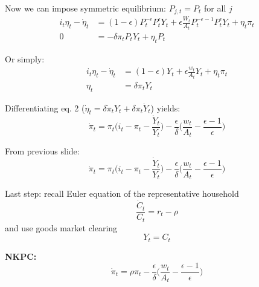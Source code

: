 \documentclass[11pt, aspectratio=169]{beamer}
\newenvironment{witemize}{\itemize\addtolength{\itemsep}{10pt}}{\enditemize}
\begin{document}
\begin{frame}{}
\begin{witemize}

\item Now we can impose symmetric equilibrium: $P_{j, t} = P_t$ for all $j$
\begin{align*}
	i_t \eta_t - \dot \eta_t  &= (1-\epsilon) P_t^{-\epsilon} P_t^{\epsilon} Y_t + \epsilon \frac{W_t}{A_t} P_t^{-\epsilon - 1} P_t^{\epsilon} Y_t + \eta_t \pi_t  \\
	0 &= - \delta \pi_t P_t Y_t + \eta_t P_t
\end{align*}

\item Or simply:
\begin{align*}
	i_t \eta_t - \dot \eta_t  &= (1-\epsilon) Y_t + \epsilon \frac{w_t}{A_t} Y_t + \eta_t \pi_t  \\
	\eta_t &= \delta \pi_t Y_t
\end{align*}

\item Differentiating eq. 2 ($\dot \eta_t = \delta \dot \pi_t Y_t + \delta \pi_t \dot Y_t$) yields:
\begin{equation*}
	 \dot \pi_t = \pi_t \bigg( i_t -  \pi_t - \frac{\dot Y_t}{Y_t} \bigg) - \frac{\epsilon}{\delta} \bigg( \frac{w_t}{A_t} - \frac{\epsilon - 1}{\epsilon} \bigg)
\end{equation*}
\end{witemize}
\end{frame}


\begin{frame}{}
\begin{witemize}

\item From previous slide: 
\begin{equation*}
	 \dot \pi_t = \pi_t \bigg( i_t -  \pi_t - \frac{\dot Y_t}{Y_t} \bigg) - \frac{\epsilon}{\delta} \bigg( \frac{w_t}{A_t} - \frac{\epsilon - 1}{\epsilon} \bigg)
\end{equation*}

\item Last step: recall Euler equation of the representative household
\begin{equation*}
	\frac{\dot C_t}{C_t} = r_t - \rho
\end{equation*}
and use goods market clearing
\begin{equation*}
	Y_t = C_t
\end{equation*}

\item \textbf{NKPC:}
\begin{equation*}
	 \dot \pi_t = \rho \pi_t - \frac{\epsilon}{\delta} \bigg( \frac{w_t}{A_t} - \frac{\epsilon - 1}{\epsilon} \bigg)
\end{equation*}
\end{witemize}
\end{frame}
\end{document}
